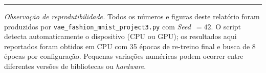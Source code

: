 \documentclass[11pt,a4paper]{article}
\begin{document}
\vspace{0.6em}
\hrule
\vspace{0.4em}
{\footnotesize \textit{Observação de reprodutibilidade.} Todos os números e figuras deste relatório foram produzidos por \texttt{vae\_fashion\_mnist\_project3.py} com \textit{Seed}~$=42$. O script detecta automaticamente o dispositivo (CPU ou GPU); os resultados aqui reportados foram obtidos em CPU com 35 épocas de re-treino final e busca de 8 épocas por configuração. Pequenas variações numéricas podem ocorrer entre diferentes versões de bibliotecas ou \textit{hardware}.}
\end{document}
